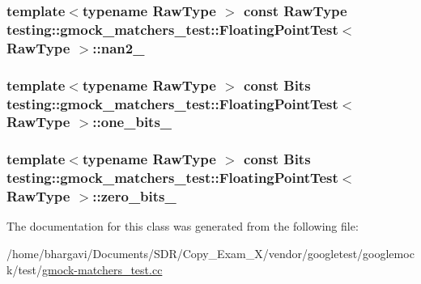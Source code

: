 \subsubsection[{\texorpdfstring{nan2\+\_\+}{nan2_}}]{\setlength{\rightskip}{0pt plus 5cm}template$<$typename Raw\+Type $>$ const Raw\+Type {\bf testing\+::gmock\+\_\+matchers\+\_\+test\+::\+Floating\+Point\+Test}$<$ Raw\+Type $>$\+::nan2\+\_\+\hspace{0.3cm}{\ttfamily [protected]}}\hypertarget{classtesting_1_1gmock__matchers__test_1_1_floating_point_test_a4af3b3e53a06d271479ff30f5d5ee155}{}\label{classtesting_1_1gmock__matchers__test_1_1_floating_point_test_a4af3b3e53a06d271479ff30f5d5ee155}
\subsubsection[{\texorpdfstring{one\+\_\+bits\+\_\+}{one_bits_}}]{\setlength{\rightskip}{0pt plus 5cm}template$<$typename Raw\+Type $>$ const {\bf Bits} {\bf testing\+::gmock\+\_\+matchers\+\_\+test\+::\+Floating\+Point\+Test}$<$ Raw\+Type $>$\+::one\+\_\+bits\+\_\+\hspace{0.3cm}{\ttfamily [protected]}}\hypertarget{classtesting_1_1gmock__matchers__test_1_1_floating_point_test_ae26de8492d307d2b4c30f6b952d9a412}{}\label{classtesting_1_1gmock__matchers__test_1_1_floating_point_test_ae26de8492d307d2b4c30f6b952d9a412}
\subsubsection[{\texorpdfstring{zero\+\_\+bits\+\_\+}{zero_bits_}}]{\setlength{\rightskip}{0pt plus 5cm}template$<$typename Raw\+Type $>$ const {\bf Bits} {\bf testing\+::gmock\+\_\+matchers\+\_\+test\+::\+Floating\+Point\+Test}$<$ Raw\+Type $>$\+::zero\+\_\+bits\+\_\+\hspace{0.3cm}{\ttfamily [protected]}}\hypertarget{classtesting_1_1gmock__matchers__test_1_1_floating_point_test_afb9b6beb1f152693155cf7db4e1fc4d2}{}\label{classtesting_1_1gmock__matchers__test_1_1_floating_point_test_afb9b6beb1f152693155cf7db4e1fc4d2}


The documentation for this class was generated from the following file\+:\begin{DoxyCompactItemize}
\item 
/home/bhargavi/\+Documents/\+S\+D\+R/\+Copy\+\_\+\+Exam\+\_\+X/vendor/googletest/googlemock/test/\hyperlink{gmock-matchers__test_8cc}{gmock-\/matchers\+\_\+test.\+cc}\end{DoxyCompactItemize}

